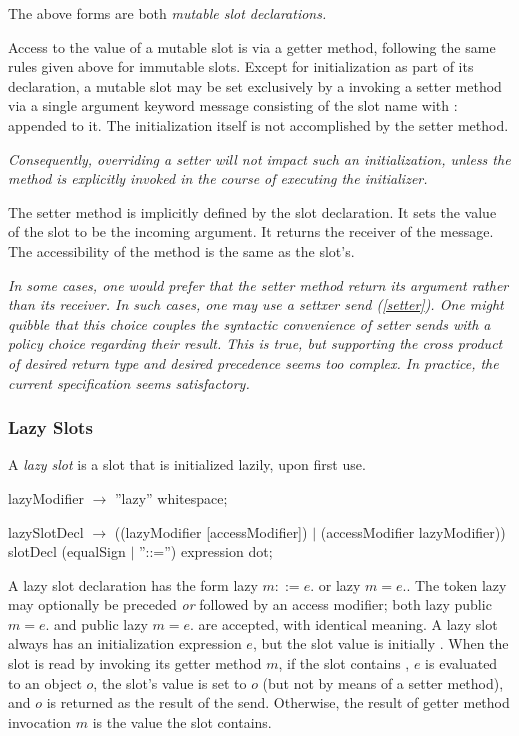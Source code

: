 \documentclass{article}
\newcommand{\code}[1]{{\sf #1}}
\begin{document}
The above forms are both {\em mutable slot declarations.}

Access to the value of a mutable slot is via a getter method,  following the same rules given above for immutable slots.  Except for initialization as part of its declaration, a mutable slot may be set exclusively by a invoking a setter method via a single argument keyword message consisting of the slot name with : appended to it.   The initialization itself is not accomplished by the setter method.

{\it
Consequently, overriding a setter will not impact such an initialization, unless the method is explicitly invoked in the course of executing the initializer.
}

The setter method is implicitly defined by the slot declaration. It sets the value of the slot to be the incoming argument. It returns the receiver of the message. The accessibility of the method is the same as the slot's.



{\it 
In some cases, one would prefer that the setter method return its argument rather than its receiver.
In such cases, one may use a settxer send (\ref{setter}). One might quibble that this choice couples the syntactic convenience of setter sends with a policy choice regarding their result. This is true, but supporting the cross product of desired return type and desired precedence seems too complex. In practice, the current specification seems satisfactory.
}

\subsubsection{Lazy Slots}
\label{lazySlots}

A {\em lazy slot} is a  slot that is initialized lazily, upon first use. 

\begin{newspeak}
lazyModifier $\rightarrow$ ''lazy'' whitespace;

lazySlotDecl $\rightarrow$ ((lazyModifier [accessModifier]) $|$ (accessModifier lazyModifier))
                      slotDecl (equalSign $|$  ''::='') expression dot;
\end{newspeak}

A lazy slot declaration has the form \code{lazy $m ::= e.$} or \code{lazy $m = e.$}. The token \code{lazy} may optionally be preceded {\em or} followed by an access modifier; both \code{lazy public $m = e.$} and \code{public lazy $m = e.$} are accepted, with identical meaning.
 A lazy slot  always has an initialization expression $e$, but the slot value is initially \NIL{}.
When the slot is read by invoking its getter method $m$, if the slot contains \NIL{}, $e$ is evaluated to an object $o$, the slot's value is set to $o$ (but not by means of a setter method), and $o$ is returned as the result of the send.  Otherwise, the result of getter method invocation $m$ is the value the slot contains.  
\end{document}
